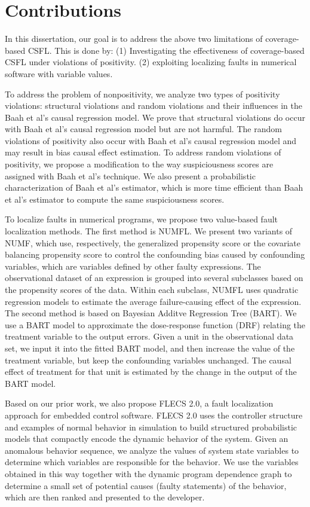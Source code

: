 \section {Contributions}
In this dissertation, our goal is to address the above two limitations of coverage-based CSFL. This is done by: (1) Investigating the effectiveness of coverage-based CSFL under violations of positivity. (2) exploiting localizing faults in numerical software with variable values. 

To address the problem of nonpositivity, we analyze two types of positivity violations: structural violations and random violations and their influences in the Baah et al's causal regression model. We prove that structural violations do occur with Baah et al's causal regression model \cite{baah2010causal} but are not harmful. The random violations of positivity also occur with Baah et al's causal regression model and may result in bias causal effect estimation. To address random violations of positivity, we propose a modification to the way suspiciousness scores are assigned with Baah et al's technique. We also present a probabilistic characterization of Baah et al's estimator, which is more time efficient than Baah et al's estimator to compute the same suspiciousness scores.

To localize faults in numerical programs, we propose two value-based fault localization methods. The first method is NUMFL. We present two variants of NUMF, which use, respectively, the generalized propensity score or the covariate balancing propensity score to control the confounding bias caused by confounding variables, which are variables defined by other faulty expressions.  The  observational dataset of an expression is grouped into several subclasses based on the propensity scores of the data. Within each subclass, NUMFL uses quadratic regression models to estimate the average failure-causing effect of the expression. The second method is based on Bayesian Additve Regression Tree (BART). We use a BART model to approximate the dose-response function (DRF) relating the treatment variable to the output errors. Given a unit in the observational data set, we input it into the fitted BART model, and then increase the value of the treatment variable, but keep the confounding variables unchanged. The causal effect of treatment for that unit is estimated by the change in the output of the BART model. 

Based on our prior work, we also propose FLECS 2.0, a fault localization approach for embedded control software. FLECS 2.0 uses the controller structure and examples of normal behavior in simulation to build structured probabilistic models that compactly encode the dynamic behavior of the system. Given an anomalous behavior sequence, we analyze the values of system state variables to determine which variables are responsible for the behavior. We use the variables obtained in this way together with the dynamic program dependence graph to determine a small set of potential causes (faulty statements) of the behavior, which are then ranked and presented to the developer.

